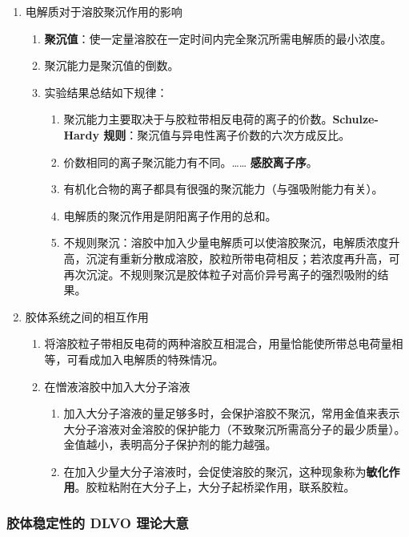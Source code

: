 \begin{enumerate}
    \item 电解质对于溶胶聚沉作用的影响
    \begin{enumerate}
        \item \textbf{聚沉值}：使一定量溶胶在一定时间内完全聚沉所需电解质的最小浓度。
        \item 聚沉能力是聚沉值的倒数。
        \item 实验结果总结如下规律：
        \begin{enumerate}
            \item 聚沉能力主要取决于与胶粒带相反电荷的离子的价数。\textbf{Schulze-Hardy 规则}：聚沉值与异电性离子价数的六次方成反比。
            \item 价数相同的离子聚沉能力有不同。…… \textbf{感胶离子序}。
            \item 有机化合物的离子都具有很强的聚沉能力（与强吸附能力有关）。
            \item 电解质的聚沉作用是阴阳离子作用的总和。
            \item 不规则聚沉：溶胶中加入少量电解质可以使溶胶聚沉，电解质浓度升高，沉淀有重新分散成溶胶，胶粒所带电荷相反；若浓度再升高，可再次沉淀。不规则聚沉是胶体粒子对高价异号离子的强烈吸附的结果。
        \end{enumerate}
    \end{enumerate}
    \item 胶体系统之间的相互作用
    \begin{enumerate}
        \item 将溶胶粒子带相反电荷的两种溶胶互相混合，用量恰能使所带总电荷量相等，可看成加入电解质的特殊情况。
        \item 在憎液溶胶中加入大分子溶液
        \begin{enumerate}
            \item 加入大分子溶液的量足够多时，会保护溶胶不聚沉，常用金值来表示大分子溶液对金溶胶的保护能力（不致聚沉所需高分子的最少质量）。金值越小，表明高分子保护剂的能力越强。
            \item 在加入少量大分子溶液时，会促使溶胶的聚沉，这种现象称为\textbf{敏化作用}。胶粒粘附在大分子上，大分子起桥梁作用，联系胶粒。
        \end{enumerate}
    \end{enumerate}
\end{enumerate}

\subsubsection{胶体稳定性的 DLVO 理论大意}

